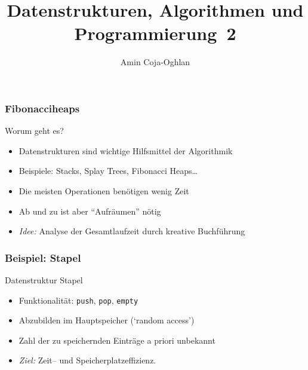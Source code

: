 \documentclass[aspectratio=1610, 11pt]{beamer}
\title{Datenstrukturen, Algorithmen und Programmierung~2}
\author[A.~Coja-Oghlan]{Amin Coja-Oghlan}
\institute[DAP2]{Lehrstuhl Informatik 2\\Fakult\"at f\"ur Informatik}
\newcommand{\mytitle}{Fibonacciheaps}
\begin{document}
\frame[plain]{\titlepage}

\begin{frame}\frametitle{\mytitle}
	\begin{exampleblock}{Worum geht es?}
		\begin{itemize}
			\item Datenstrukturen sind wichtige Hilfsmittel der Algorithmik
			\item \alert{Beispiele:} Stacks, Splay Trees, Fibonacci Heaps\dots
			\item Die meisten Operationen ben\"otigen wenig Zeit
			\item Ab und zu ist aber ``Aufr\"aumen'' n\"otig
			\item \emph{Idee:} Analyse der Gesamtlaufzeit durch kreative Buchf\"uhrung 
		\end{itemize}
	\end{exampleblock}
\end{frame}


\begin{frame}\frametitle{Beispiel: Stapel}
	\begin{exampleblock}{Datenstruktur Stapel}
		\begin{itemize}
			\item Funktionalit\"at: {\tt push}, {\tt pop}, {\tt empty}
			\item Abzubilden im Hauptspeicher (`random access')
			\item Zahl der zu speichernden Eintr\"age a priori unbekannt
			\item \emph{Ziel:} Zeit-- und Speicherplatzeffizienz.
		\end{itemize}
	\end{exampleblock}
\end{frame}
\end{document}
